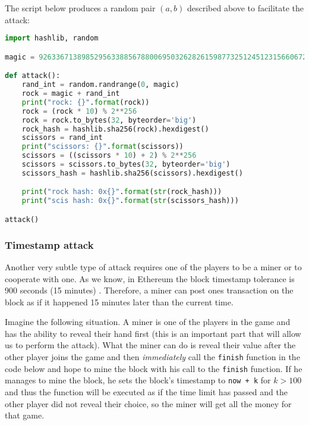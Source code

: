 \documentclass{article}
\begin{document}
    \noindent The script below produces a random pair \((a,
    b)\) described above to facilitate the attack:

    \begin{lstlisting}[language=Python]
import hashlib, random

magic = 92633671389852956338856788006950326282615987732512451231566067206330503711949

def attack():
    rand_int = random.randrange(0, magic)
    rock = magic + rand_int
    print("rock: {}".format(rock))
    rock = (rock * 10) % 2**256
    rock = rock.to_bytes(32, byteorder='big')
    rock_hash = hashlib.sha256(rock).hexdigest()
    scissors = rand_int
    print("scissors: {}".format(scissors))
    scissors = ((scissors * 10) + 2) % 2**256
    scissors = scissors.to_bytes(32, byteorder='big')
    scissors_hash = hashlib.sha256(scissors).hexdigest()

    print("rock hash: 0x{}".format(str(rock_hash)))
    print("scis hash: 0x{}".format(str(scissors_hash)))

attack()
    \end{lstlisting}
    
    \subsubsection{Timestamp attack}
    Another very subtle type of attack requires one of the
    players to be a miner or to cooperate with one. As we
    know, in Ethereum the block timestamp tolerance is 900
    seconds (15 minutes) \cite{ethrules}. Therefore, a miner
    can post ones transaction on the block as if it happened
    15 minutes later than the current time.
    \newline

    \noindent Imagine the following situation. A miner is
    one of the players in the game and has the ability to
    reveal their hand first (this is an important part that
    will allow us to perform the attack). What the miner can
    do is reveal their value after the other player joins
    the game and then {\itshape immediately} call the
    \verb|finish| function in the code below and hope to
    mine the block with his call to the \verb|finish|
    function. If he manages to mine the block, he sets the
    block's timestamp to \verb|now + k| for \(k > 100\) and
    thus the function will be executed as if the time limit
    has passed and the other player did not reveal their
    choice, so the miner will get all the money for that
    game.
\end{document}
